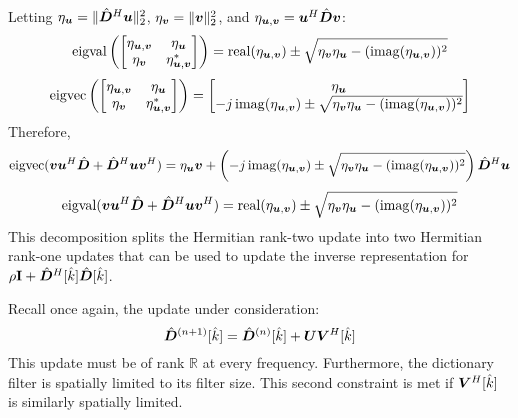 Letting $\eta_{\bm{u}} = \|\hat{\bm{D}}^H\bm{u}\|_2^2$, $\eta_{\bm{v}} = \|\bm{v}\|_2^2$, and $\eta_{\bm{u},\bm{v}} = \bm{u}^H\hat{\bm{D}}\bm{v}$:
%
\begin{equation}
\operatorname{eigval}\left(\begin{bmatrix}
\eta_{\bm{u},\bm{v}} & \eta_{\bm{u}} \\
\eta_{\bm{v}}    & \eta_{\bm{u},\bm{v}}^*
\end{bmatrix}\right)
= \operatorname{real}(\eta_{\bm{u},\bm{v}}) \pm \sqrt{\eta_{\bm{v}}\eta_{\bm{u}} - (\operatorname{imag}(\eta_{\bm{u},\bm{v}}))^2}
\end{equation}
%
\begin{equation}
\operatorname{eigvec}
\left(\begin{bmatrix}
\eta_{\bm{u},\bm{v}} & \eta_{\bm{u}} \\
\eta_{\bm{v}}    & \eta_{\bm{u},\bm{v}}^*
\end{bmatrix}\right)
= \begin{bmatrix}
\eta_{\bm{u}} \\
-j\operatorname{imag}(\eta_{\bm{u},\bm{v}}) \pm \sqrt{\eta_{\bm{v}}\eta_{\bm{u}} - (\operatorname{imag}(\eta_{\bm{u},\bm{v}}))^2}
\end{bmatrix}
\end{equation}
%
%
%
Therefore, 
%
\begin{equation}
\operatorname{eigvec}
(
\bm{v}\bm{u}^H\hat{\bm{D}} + \hat{\bm{D}}^H\bm{u}\bm{v}^H
) = 
\eta_{\bm{u}}\bm{v} +
\left(-j\operatorname{imag}(\eta_{\bm{u},\bm{v}}) \pm \sqrt{\eta_{\bm{v}} \eta_{\bm{u}} - (\operatorname{imag}(\eta_{\bm{u},\bm{v}}))^2}\right)\hat{\bm{D}}^H\bm{u}
\end{equation}
%
%
\begin{equation}
\operatorname{eigval}(
\bm{v}\bm{u}^H\hat{\bm{D}} + \hat{\bm{D}}^H\bm{u}\bm{v}^H
)
= \operatorname{real}(\eta_{\bm{u},\bm{v}}) \pm \sqrt{\eta_{\bm{v}}\eta_{\bm{u}} - (\operatorname{imag}(\eta_{\bm{u},\bm{v}}))^2}
\end{equation}
%
This decomposition splits the Hermitian rank-two update into two Hermitian rank-one updates that can be used to update the inverse representation for $\rho{\bf I} + \hat{\bm{D}}^H[\hat{k}]\hat{\bm{D}}[\hat{k}]$.

Recall once again, the update under consideration:
\begin{equation}
\hat{\bm{D}}^{(n + 1)}[\hat{k}] = \hat{\bm{D}}^{(n)}[\hat{k}] + \bm{U}\bm{V}^H[\hat{k}]
\end{equation}
%
This update must be of rank $\mathbb{R}$ at every frequency. Furthermore, the dictionary filter is spatially limited to its filter size. This second constraint is met if $\bm{V}^H[\hat{k}]$ is similarly spatially limited.


